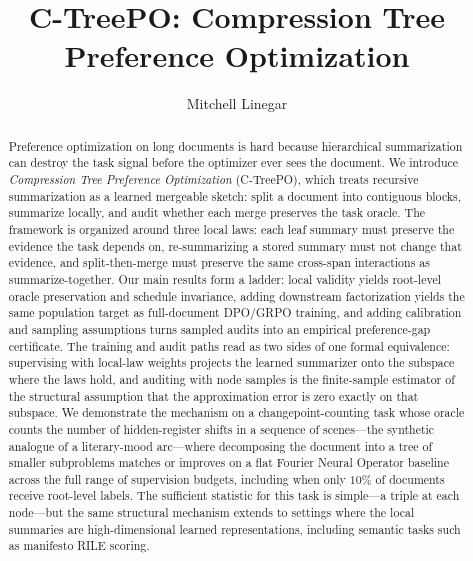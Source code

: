 \documentclass[11pt]{article}
\title{C-TreePO: Compression Tree Preference Optimization}
\author{Mitchell Linegar}
\date{}
\begin{document}
\maketitle

\begin{abstract}
Preference optimization on long documents is hard because hierarchical summarization can destroy the task signal before the optimizer ever sees the document.
We introduce \emph{Compression Tree Preference Optimization} (C-TreePO), which treats recursive summarization as a learned mergeable sketch: split a document into contiguous blocks, summarize locally, and audit whether each merge preserves the task oracle.
The framework is organized around three local laws: each leaf summary must preserve the evidence the task depends on, re-summarizing a stored summary must not change that evidence, and split-then-merge must preserve the same cross-span interactions as summarize-together.
Our main results form a ladder: local validity yields root-level oracle preservation and schedule invariance, adding downstream factorization yields the same population target as full-document DPO/GRPO training, and adding calibration and sampling assumptions turns sampled audits into an empirical preference-gap certificate. The training and audit paths read as two sides of one formal equivalence: supervising with local-law weights projects the learned summarizer onto the subspace where the laws hold, and auditing with node samples is the finite-sample estimator of the structural assumption that the approximation error is zero exactly on that subspace.
We demonstrate the mechanism on a changepoint-counting task whose oracle counts the number of hidden-register shifts in a sequence of scenes---the synthetic analogue of a literary-mood arc---where decomposing the document into a tree of smaller subproblems matches or improves on a flat Fourier Neural Operator baseline across the full range of supervision budgets, including when only $10\%$ of documents receive root-level labels.
The sufficient statistic for this task is simple---a triple at each node---but the same structural mechanism extends to settings where the local summaries are high-dimensional learned representations, including semantic tasks such as manifesto RILE scoring.
\end{abstract}

















\end{document}
